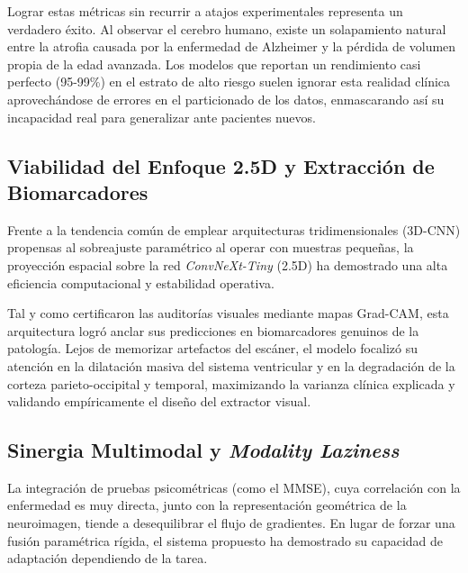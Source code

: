 \documentclass[12pt, oneside, english, spanish]{book}
\begin{document}
Lograr estas métricas sin recurrir a atajos experimentales representa un verdadero éxito. Al observar el cerebro humano, existe un solapamiento natural entre la atrofia causada por la enfermedad de Alzheimer y la pérdida de volumen propia de la edad avanzada. Los modelos que reportan un rendimiento casi perfecto (95-99\%) en el estrato de alto riesgo suelen ignorar esta realidad clínica aprovechándose de errores en el particionado de los datos, enmascarando así su incapacidad real para generalizar ante pacientes nuevos.

\subsection{Viabilidad del Enfoque 2.5D y Extracción de Biomarcadores} \label{subsec:disc_prior_asfixia}

Frente a la tendencia común de emplear arquitecturas tridimensionales (3D-CNN) propensas al sobreajuste paramétrico al operar con muestras pequeñas, la proyección espacial sobre la red \textit{ConvNeXt-Tiny} (2.5D) ha demostrado una alta eficiencia computacional y estabilidad operativa. 

Tal y como certificaron las auditorías visuales mediante mapas Grad-CAM, esta arquitectura logró anclar sus predicciones en biomarcadores genuinos de la patología. Lejos de memorizar artefactos del escáner, el modelo focalizó su atención en la dilatación masiva del sistema ventricular y en la degradación de la corteza parieto-occipital y temporal, maximizando la varianza clínica explicada y validando empíricamente el diseño del extractor visual.

\subsection{Sinergia Multimodal y \textit{Modality Laziness}} \label{subsec:disc_neuroimagen_dominancia}

La integración de pruebas psicométricas (como el MMSE), cuya correlación con la enfermedad es muy directa, junto con la representación geométrica de la neuroimagen, tiende a desequilibrar el flujo de gradientes. En lugar de forzar una fusión paramétrica rígida, el sistema propuesto ha demostrado su capacidad de adaptación dependiendo de la tarea.
\end{document}
